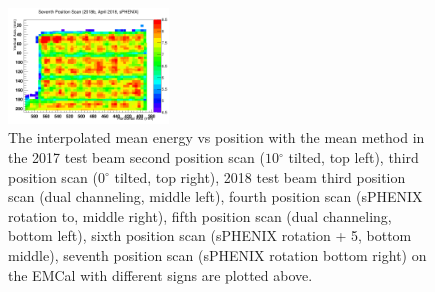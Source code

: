 \documentclass[hidelinks,11pt]{article}
\numberwithin{figure}{section}
\numberwithin{table}{section}
\newcommand{\degree}{\mbox{$^\circ$}\xspace}
\begin{document}
\begin{figure}[hbtp]
\begin{center}
\includegraphics[width=0.38\textwidth]{Plots/InterMean/Inter20187thScan.png}
\caption{The interpolated mean energy vs position with the mean method in the 2017 test beam second position scan ($10 \degree$ tilted, top left), third position scan ($0 \degree$ tilted, top right), 2018 test beam third position scan (dual channeling, middle left), fourth position scan (sPHENIX rotation to, middle right), fifth position scan (dual channeling, bottom left), sixth position scan (sPHENIX rotation + 5, bottom middle),  seventh position scan (sPHENIX rotation bottom right) on the EMCal with different signs are plotted above.}
\label{fig:MeanMethods}
\end{center}
\end{figure} 
\end{document}
